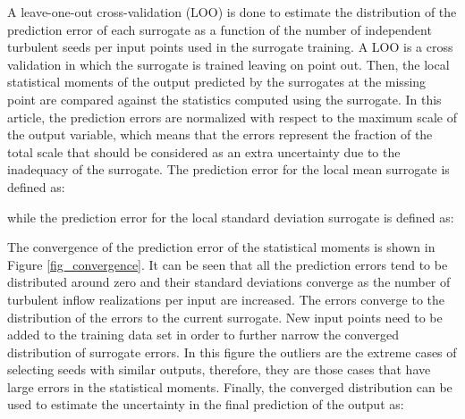 \documentclass[preprint,12pt]{elsarticle}
\begin{document}
A leave-one-out cross-validation (LOO) is done to estimate the distribution of the prediction error of each surrogate as a function of the number of independent turbulent seeds per input points used in the surrogate training. A LOO is a cross validation in which the surrogate is trained leaving on point out. Then, the local statistical moments of the output predicted by the surrogates at the missing point are compared against the statistics computed using the surrogate. In this article, the prediction errors are normalized with respect to the maximum scale of the output variable, which means that the errors represent the fraction of the total scale that should be considered as an extra uncertainty due to the inadequacy of the surrogate. The prediction error for the local mean surrogate is defined as:


\noindent while the prediction error for the local standard deviation surrogate is defined as:




The convergence of the prediction error of the statistical moments is shown in Figure \ref{fig_convergence}. It can be seen that all the prediction errors tend to be distributed around zero and their standard deviations converge as the number of turbulent inflow realizations per input are increased. The errors converge to the distribution of the errors to the current surrogate. New input points need to be added to the training data set in order to further narrow the converged distribution of surrogate errors. In this figure the outliers are the extreme cases of selecting seeds with similar outputs, therefore, they are those cases that have large errors in the statistical moments. Finally, the converged distribution can be used to estimate the uncertainty in the final prediction of the output as:

\end{document}
